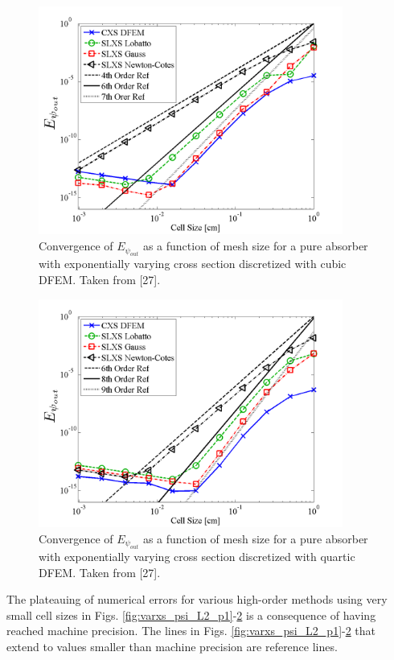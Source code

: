 %
\begin{figure}[!htp]
\centering
\includegraphics[width=10cm]{chapter3_variable_xs/P3_VarXS_E_psi_out.png}
\caption{Convergence of $E_{\psi_{out}}$  as a function of mesh size for a pure absorber with exponentially varying cross section discretized with cubic DFEM.  Taken from [27].}
\label{fig:varxs_psi_out_p3}
\end{figure}
%
\begin{figure}[!hbp]
\centering
\includegraphics[width=10cm]{chapter3_variable_xs/P4_VarXS_E_psi_out.png}
\caption{Convergence of $E_{\psi_{out}}$  as a function of mesh size for a pure absorber with exponentially varying cross section discretized with quartic DFEM.  Taken from [27].} 
\label{fig:varxs_psi_out_p4}
\end{figure}
\clearpage
The plateauing of numerical errors for various high-order methods using very small cell sizes in Figs. \ref{fig:varxs_psi_L2_p1}-\ref{fig:varxs_psi_out_p4} is a consequence of having  reached machine precision.
The lines in Figs. \ref{fig:varxs_psi_L2_p1}-\ref{fig:varxs_psi_out_p4} that extend to values smaller than machine precision are reference lines.

